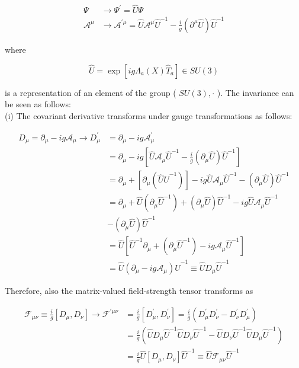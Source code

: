 \documentclass[10pt, letterpaper]{article}
\begin{document}
$$
\begin{aligned}
\Psi & \longrightarrow \Psi^{\prime}=\hat{U} \Psi \\
\mathcal{A}^{\mu} & \longrightarrow \mathcal{A}^{\prime \mu}=\hat{U} \mathcal{A}^{\mu} \hat{U}^{-1}-\frac{i}{g}\left(\partial^{\mu} \hat{U}\right) \hat{U}^{-1}
\end{aligned}
$$

where

$$
\hat{U}=\exp \left[i g \Lambda_{a}(X) \hat{T}_{a}\right] \in S U(3)
$$

is a representation of an element of the group ( $S U(3), \cdot$ ). The invariance can be seen as follows:\\
(i) The covariant derivative transforms under gauge transformations as follows:

$$
\begin{aligned}
D_{\mu}=\partial_{\mu}-i g \mathcal{A}_{\mu} \longrightarrow D_{\mu}^{\prime} & =\partial_{\mu}-i g \mathcal{A}_{\mu}^{\prime} \\
& =\partial_{\mu}-i g\left[\hat{U} \mathcal{A}_{\mu} \hat{U}^{-1}-\frac{i}{g}\left(\partial_{\mu} \hat{U}\right) \hat{U}^{-1}\right] \\
& =\partial_{\mu}+\left[\partial_{\mu}\left(\hat{U} \hat{U}^{-1}\right)\right]-i g \hat{U} \mathcal{A}_{\mu} \hat{U}^{-1}-\left(\partial_{\mu} \hat{U}\right) \hat{U}^{-1} \\
& =\partial_{\mu}+\hat{U}\left(\partial_{\mu} \hat{U}^{-1}\right)+\left(\partial_{\mu} \hat{U}\right) \hat{U}^{-1}-i g \hat{U} \mathcal{A}_{\mu} \hat{U}^{-1} \\
& -\left(\partial_{\mu} \hat{U}\right) \hat{U}^{-1} \\
& =\hat{U}\left[\hat{U}^{-1} \partial_{\mu}+\left(\partial_{\mu} \hat{U}^{-1}\right)-i g \mathcal{A}_{\mu} \hat{U}^{-1}\right] \\
& =\hat{U}\left(\partial_{\mu}-i g \mathcal{A}_{\mu}\right) \hat{U}^{-1} \equiv \hat{U} D_{\mu} \hat{U}^{-1}
\end{aligned}
$$

Therefore, also the matrix-valued field-strength tensor transforms as

$$
\begin{aligned}
\mathcal{F}_{\mu \nu} \equiv \frac{i}{g}\left[D_{\mu}, D_{\nu}\right] \longrightarrow \mathcal{F}^{\prime \mu \nu} & =\frac{i}{g}\left[D_{\mu}^{\prime}, D_{\nu}^{\prime}\right]=\frac{i}{g}\left(D_{\mu}^{\prime} D_{\nu}^{\prime}-D_{\nu}^{\prime} D_{\mu}^{\prime}\right) \\
& =\frac{i}{g}\left(\hat{U} D_{\mu} \hat{U}^{-1} \hat{U} D_{\nu} \hat{U}^{-1}-\hat{U} D_{\nu} \hat{U}^{-1} \hat{U} D_{\mu} \hat{U}^{-1}\right) \\
& =\frac{i}{g} \hat{U}\left[D_{\mu}, D_{\nu}\right] \hat{U}^{-1} \equiv \hat{U} \mathcal{F}_{\mu \nu} \hat{U}^{-1}
\end{aligned}
$$
\end{document}
